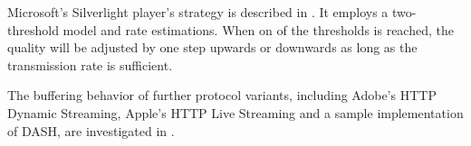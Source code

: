 Microsoft's Silverlight player's strategy is described in \cite{BLTJ:BLTJ20505}. It employs a two-threshold model and rate estimations. When on of the thresholds is reached, the quality will be adjusted by one step upwards or downwards as long as the transmission rate is sufficient.

The buffering behavior of further protocol variants, including Adobe's \gls{HTTP} Dynamic Streaming, Apple's \gls{HTTP} Live Streaming and a sample implementation of \gls{DASH}, are investigated in \cite{Muller:2012:EDA:2151677.2151686,akhshabi2011experimental}.









